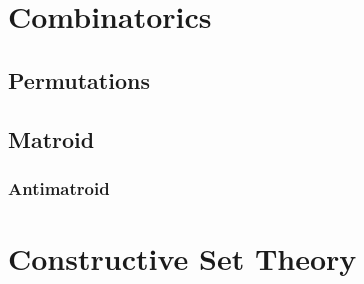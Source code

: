 \section{Combinatorics}

\subsection{Permutations}\label{sec:permutations}



\subsection{Matroid}\label{sec:matroid}

\subsubsection{Antimatroid}\label{sec:antimatroid}



\section{Constructive Set Theory}\label{sec:constructive_set_theory}
